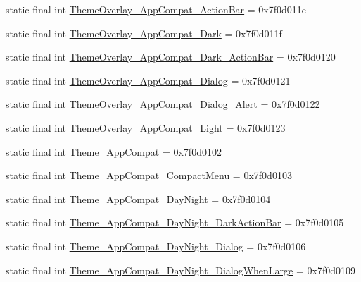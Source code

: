 \begin{DoxyCompactItemize}
\item 
static final int \mbox{\hyperlink{classandroid_1_1support_1_1design_1_1_r_1_1style_ab6f6f318923271179ec1e4216744016d}{Theme\+Overlay\+\_\+\+App\+Compat\+\_\+\+Action\+Bar}} = 0x7f0d011e
\item 
static final int \mbox{\hyperlink{classandroid_1_1support_1_1design_1_1_r_1_1style_a66d45e018d9ab21755dd3dfe91aa7f0a}{Theme\+Overlay\+\_\+\+App\+Compat\+\_\+\+Dark}} = 0x7f0d011f
\item 
static final int \mbox{\hyperlink{classandroid_1_1support_1_1design_1_1_r_1_1style_aa195b492725c39a7a365b9270076be81}{Theme\+Overlay\+\_\+\+App\+Compat\+\_\+\+Dark\+\_\+\+Action\+Bar}} = 0x7f0d0120
\item 
static final int \mbox{\hyperlink{classandroid_1_1support_1_1design_1_1_r_1_1style_a4ff8165e69361614a7b6f17506bebed2}{Theme\+Overlay\+\_\+\+App\+Compat\+\_\+\+Dialog}} = 0x7f0d0121
\item 
static final int \mbox{\hyperlink{classandroid_1_1support_1_1design_1_1_r_1_1style_a65b40e6a0cde1145b8fe60d0be10292d}{Theme\+Overlay\+\_\+\+App\+Compat\+\_\+\+Dialog\+\_\+\+Alert}} = 0x7f0d0122
\item 
static final int \mbox{\hyperlink{classandroid_1_1support_1_1design_1_1_r_1_1style_ae7401b46ade43c0f9362b4284f5ea048}{Theme\+Overlay\+\_\+\+App\+Compat\+\_\+\+Light}} = 0x7f0d0123
\item 
static final int \mbox{\hyperlink{classandroid_1_1support_1_1design_1_1_r_1_1style_a47abe16cf2c44a07f0ea97b28021e096}{Theme\+\_\+\+App\+Compat}} = 0x7f0d0102
\item 
static final int \mbox{\hyperlink{classandroid_1_1support_1_1design_1_1_r_1_1style_af28bb64d8932aa6cd8d8b7c0dce5dc85}{Theme\+\_\+\+App\+Compat\+\_\+\+Compact\+Menu}} = 0x7f0d0103
\item 
static final int \mbox{\hyperlink{classandroid_1_1support_1_1design_1_1_r_1_1style_a700fdd059b4bd7eb2b2e636cd4a323de}{Theme\+\_\+\+App\+Compat\+\_\+\+Day\+Night}} = 0x7f0d0104
\item 
static final int \mbox{\hyperlink{classandroid_1_1support_1_1design_1_1_r_1_1style_a5eb940eb578df92cfd2b8bb1b6d3aee3}{Theme\+\_\+\+App\+Compat\+\_\+\+Day\+Night\+\_\+\+Dark\+Action\+Bar}} = 0x7f0d0105
\item 
static final int \mbox{\hyperlink{classandroid_1_1support_1_1design_1_1_r_1_1style_a438591c36b44ecebfae3881c33ef57b7}{Theme\+\_\+\+App\+Compat\+\_\+\+Day\+Night\+\_\+\+Dialog}} = 0x7f0d0106
\item 
static final int \mbox{\hyperlink{classandroid_1_1support_1_1design_1_1_r_1_1style_ad3e986a7ecad49e4aa2b683263281a2e}{Theme\+\_\+\+App\+Compat\+\_\+\+Day\+Night\+\_\+\+Dialog\+When\+Large}} = 0x7f0d0109

\end{DoxyCompactItemize}
